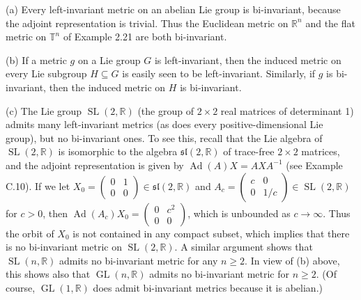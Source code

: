 \begin{example}
\label{ex:invariant-metrics-lie-groups}

(a) Every left-invariant metric on an abelian Lie group is bi-invariant, because the adjoint representation is trivial. Thus the Euclidean metric on $\mathbb{R}^n$ and the flat metric on $\mathbb{T}^n$ of Example 2.21 are both bi-invariant.

(b) If a metric $g$ on a Lie group $G$ is left-invariant, then the induced metric on every Lie subgroup $H \subseteq G$ is easily seen to be left-invariant. Similarly, if $g$ is bi-invariant, then the induced metric on $H$ is bi-invariant.

(c) The Lie group $\operatorname{SL}(2, \mathbb{R})$ (the group of $2 \times 2$ real matrices of determinant 1) admits many left-invariant metrics (as does every positive-dimensional Lie group), but no bi-invariant ones. To see this, recall that the Lie algebra of $\operatorname{SL}(2, \mathbb{R})$ is isomorphic to the algebra $\mathfrak{sl}(2, \mathbb{R})$ of trace-free $2 \times 2$ matrices, and the adjoint representation is given by $\operatorname{Ad}(A) X = AXA^{-1}$ (see Example C.10). If we let $X_0 = \begin{pmatrix} 0 & 1 \\ 0 & 0 \end{pmatrix} \in \mathfrak{sl}(2, \mathbb{R})$ and $A_c = \begin{pmatrix} c & 0 \\ 0 & 1/c \end{pmatrix} \in \operatorname{SL}(2, \mathbb{R})$ for $c > 0$, then $\operatorname{Ad}(A_c) X_0 = \begin{pmatrix} 0 & c^2 \\ 0 & 0 \end{pmatrix}$, which is unbounded as $c \to \infty$. Thus the orbit of $X_0$ is not contained in any compact subset, which implies that there is no bi-invariant metric on $\operatorname{SL}(2, \mathbb{R})$. A similar argument shows that $\operatorname{SL}(n, \mathbb{R})$ admits no bi-invariant metric for any $n \geq 2$. In view of (b) above, this shows also that $\operatorname{GL}(n, \mathbb{R})$ admits no bi-invariant metric for $n \geq 2$. (Of course, $\operatorname{GL}(1, \mathbb{R})$ does admit bi-invariant metrics because it is abelian.)


\end{example}
